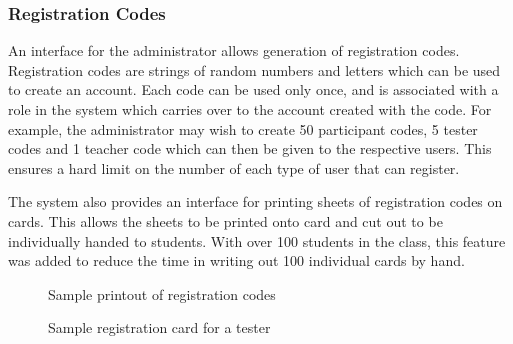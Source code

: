 \subsubsection{Registration Codes}
An interface for the administrator allows generation of registration codes. Registration
codes are strings of random numbers and letters which can be used to create an account.
Each code can be used only once, and is associated with a role in the system which carries
over to the account created with the code. For example, the administrator may wish to
create 50 participant codes, 5 tester codes and 1 teacher code which can then be given
to the respective users. This ensures a hard limit on the number of each type of user
that can register.

The system also provides an interface for printing sheets of registration codes on cards.
This allows the sheets to be printed onto card and cut out to be individually handed
to students. With over 100 students in the class, this feature was added to reduce the
time in writing out 100 individual cards by hand.

\begin{figure}
\caption{Sample printout of registration codes}
\label{fig_registrationcodes}
\end{figure}

\begin{figure}
\caption{Sample registration card for a tester}
\label{fig_registrationcodes}
\end{figure}

